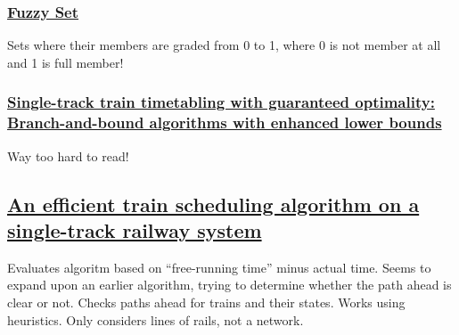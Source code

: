 \documentclass{article}
\begin{document}
\subsubsection*{\href{https://en.wikipedia.org/wiki/Fuzzy_set}{Fuzzy Set}}

Sets where their members are graded from 0 to 1, where 0 is not member at all and 1 is full member!

\subsubsection*{\href{https://ac.els-cdn.com/S0191261506000737/1-s2.0-S0191261506000737-main.pdf?_tid=02dc28ac-ceb5-4ec5-a54e-4c6d32ce7c62&acdnat=1530008179_14f86ec30be353025bc8af4b00094329}{Single-track train timetabling with guaranteed
optimality: Branch-and-bound algorithms
with enhanced lower bounds}}

Way too hard to read!

\subsection*{\href{https://link.springer.com/content/pdf/10.1007\%2Fs10951-018-0558-0.pdf}{An efficient train scheduling algorithm on a single-track railway system}}

Evaluates algoritm based on ``free-running time'' minus actual time. Seems to expand upon an earlier algorithm, trying to determine whether the path ahead is clear or not. Checks paths ahead for trains and their states. Works using heuristics. Only considers lines of rails, not a network.
\end{document}
